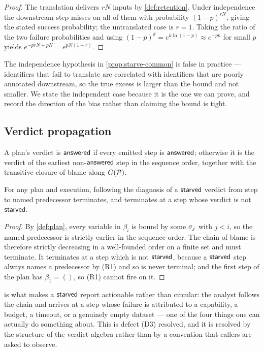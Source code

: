 \begin{proof}
The translation delivers $rN$ inputs by \cref{def:retention}. Under
independence the downstream step misses on all of them with probability
$(1-p)^{rN}$, giving the stated success probability; the untranslated case is
$r=1$. Taking the ratio of the two failure probabilities and using
$(1-p)^{k} = e^{k\ln(1-p)} \approx e^{-pk}$ for small $p$ yields
$e^{-prN + pN} = e^{pN(1-r)}$.
\end{proof}

The independence hypothesis in \cref{prop:starve-common} is false in practice
--- identifiers that fail to translate are correlated with identifiers that are
poorly annotated downstream, so the true excess is larger than the bound and
not smaller. We state the independent case because it is the one we can prove,
and record the direction of the bias rather than claiming the bound is tight.

\subsection{Verdict propagation}

\begin{definition}[Propagation]
\label{def:propagation}
A plan's verdict is $\textsf{answered}$ if every emitted step is $\textsf{answered}$; otherwise it is
the verdict of the earliest non-$\textsf{answered}$ step in the sequence order, together
with the transitive closure of blame along $G(\mathcal{P})$.
\end{definition}

\begin{proposition}
\label{prop:blame}
For any plan and execution, following the diagnosis of a $\textsf{starved}$ verdict
from step to named predecessor terminates, and terminates at a step whose
verdict is not $\textsf{starved}$.
\end{proposition}

\begin{proof}
By \cref{def:plan}, every variable in $\beta_i$ is bound by some $\sigma_j$ with
$j < i$, so the named predecessor is strictly earlier in the sequence order.
The chain of blame is therefore strictly decreasing in a well-founded order on
a finite set and must terminate. It terminates at a step which is not
$\textsf{starved}$, because a $\textsf{starved}$ step always names a predecessor by (R1) and so
is never terminal; and the first step of the plan has $\beta_1 = ()$, so (R1)
cannot fire on it.
\end{proof}

 is what makes a $\textsf{starved}$ report actionable rather than
circular: the analyst follows the chain and arrives at a step whose failure is
attributed to a capability, a budget, a timeout, or a genuinely empty dataset
--- one of the four things one can actually do something about. This is defect
(D3) resolved, and it is resolved by the structure of the verdict algebra
rather than by a convention that callers are asked to observe.
